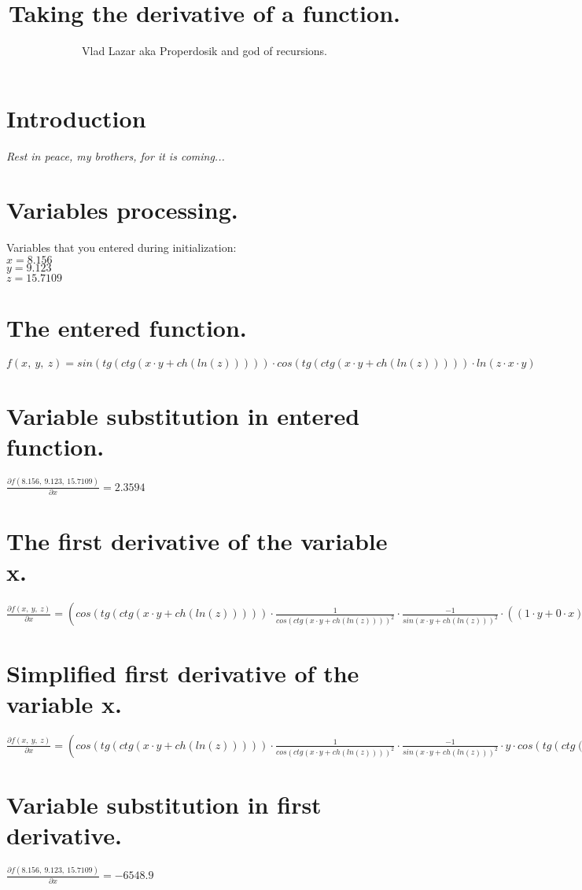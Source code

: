 \documentclass{article}
\title{\vspace{-1.0cm}\textbf{Taking the derivative of a function.}}
\author{Vlad Lazar aka Properdosik and god of recursions.}
\begin{document}
\maketitle
\section{Introduction}
\textit{Rest in peace, my brothers, for it is coming...}

\section{Variables processing.}
Variables that you entered during initialization:\\
$x = 8.156$
\\$y = 9.123$
\\$z = 15.7109$

\section{The entered function.}
$f(x,\ y,\ z) = sin(tg(ctg(x \cdot y + ch(ln(z))))) \cdot cos(tg(ctg(x \cdot y + ch(ln(z))))) \cdot ln(z \cdot x \cdot y)$

\section{Variable substitution in entered function.}
$\frac{\partial f(8.156,\ 9.123,\ 15.7109)}{\partial x} = 2.3594$

\section{The first derivative of the variable x.}
$\frac{\partial f(x,\ y,\ z)}{\partial x} = (cos(tg(ctg(x \cdot y + ch(ln(z))))) \cdot \frac{1}{cos(ctg(x \cdot y + ch(ln(z))))^{2}} \cdot \frac{-1}{sin(x \cdot y + ch(ln(z)))^{2}} \cdot ((1 \cdot y + 0 \cdot x) + sh(ln(z)) \cdot \frac{0}{z}) \cdot cos(tg(ctg(x \cdot y + ch(ln(z))))) + (-1) \cdot sin(tg(ctg(x \cdot y + ch(ln(z))))) \cdot \frac{1}{cos(ctg(x \cdot y + ch(ln(z))))^{2}} \cdot \frac{-1}{sin(x \cdot y + ch(ln(z)))^{2}} \cdot ((1 \cdot y + 0 \cdot x) + sh(ln(z)) \cdot \frac{0}{z}) \cdot sin(tg(ctg(x \cdot y + ch(ln(z)))))) \cdot ln(z \cdot x \cdot y) + \frac{((0 \cdot x + 1 \cdot z) \cdot y + 0 \cdot z \cdot x)}{z \cdot x \cdot y} \cdot sin(tg(ctg(x \cdot y + ch(ln(z))))) \cdot cos(tg(ctg(x \cdot y + ch(ln(z)))))$

\section{Simplified first derivative of the variable x.}
$\frac{\partial f(x,\ y,\ z)}{\partial x} = (cos(tg(ctg(x \cdot y + ch(ln(z))))) \cdot \frac{1}{cos(ctg(x \cdot y + ch(ln(z))))^{2}} \cdot \frac{-1}{sin(x \cdot y + ch(ln(z)))^{2}} \cdot y \cdot cos(tg(ctg(x \cdot y + ch(ln(z))))) + (-1) \cdot sin(tg(ctg(x \cdot y + ch(ln(z))))) \cdot \frac{1}{cos(ctg(x \cdot y + ch(ln(z))))^{2}} \cdot \frac{-1}{sin(x \cdot y + ch(ln(z)))^{2}} \cdot y \cdot sin(tg(ctg(x \cdot y + ch(ln(z)))))) \cdot ln(z \cdot x \cdot y) + \frac{z \cdot y}{z \cdot x \cdot y} \cdot sin(tg(ctg(x \cdot y + ch(ln(z))))) \cdot cos(tg(ctg(x \cdot y + ch(ln(z)))))$

\section{Variable substitution in first derivative.}
$\frac{\partial f(8.156,\ 9.123,\ 15.7109)}{\partial x} = -6548.9$
\end{document}
